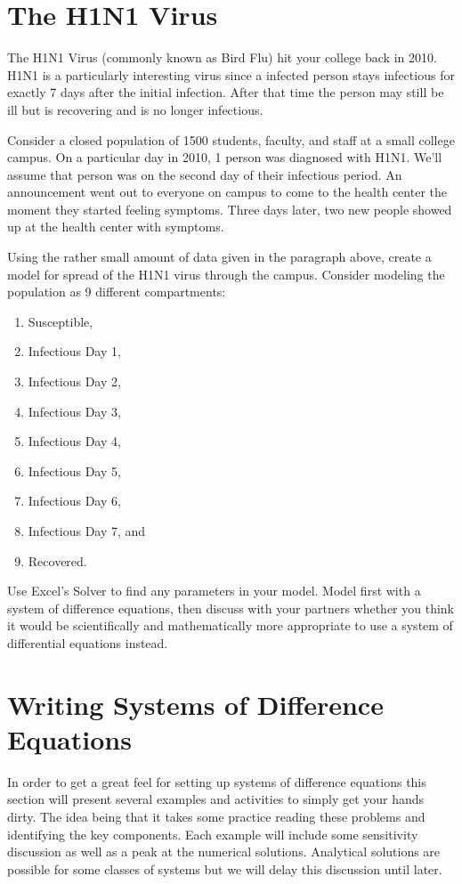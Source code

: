 \section{The H1N1 Virus}
The H1N1 Virus (commonly known as Bird Flu) hit your college back in 2010.  H1N1 is a
particularly interesting virus since a infected person stays infectious for exactly 7 days
after the initial infection.  After that time the person may still be ill but is
recovering and is no longer infectious.  

\begin{problem}
    Consider a closed population of 1500 students, faculty, and staff at a small college
    campus.  On a particular day in 2010, 1 person was diagnosed with H1N1.  We'll assume
    that person was on the second day of their infectious period.  An announcement went
    out to everyone on campus to come to the health center the moment they started feeling
    symptoms.  Three days later, two new people showed up at the health center with
    symptoms.  

    Using the rather small amount of data given in the paragraph above, create a model for
    spread of the H1N1 virus through the campus.   Consider modeling the population as 9
    different compartments:
    \begin{enumerate}
        \item Susceptible,
        \item Infectious Day 1,
        \item Infectious Day 2,
        \item Infectious Day 3,
        \item Infectious Day 4,
        \item Infectious Day 5,
        \item Infectious Day 6,
        \item Infectious Day 7, and
        \item Recovered.
    \end{enumerate}
    Use Excel's Solver to find any parameters in your model.  Model first with a system of
    difference equations, then discuss with your partners whether you think it would be
    scientifically and mathematically more appropriate to use a system of differential
    equations instead.
\end{problem}


\section{Writing Systems of Difference Equations}
In order to get a great feel for setting up systems of difference equations this section
will present several examples and activities to simply get your hands dirty.  The idea
being that it takes some practice reading these problems and identifying the key
components. Each example will include some sensitivity discussion as well as a peak at the
numerical solutions. Analytical solutions are possible for some classes of systems but we
will delay this discussion until later.

